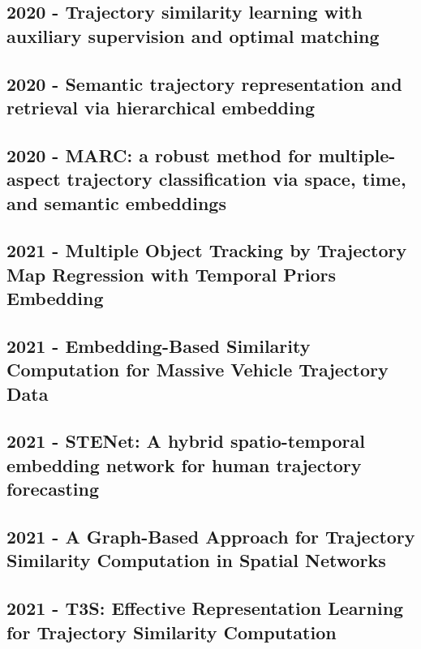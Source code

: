 \cite{fu2020trembr}

\subsection*{2020 - Trajectory similarity learning with auxiliary supervision and optimal matching}

\cite{zhang2020trajectory}

\subsection*{2020 - Semantic trajectory representation and retrieval via hierarchical embedding}
\cite{gao2020semantic}

\subsection*{2020 - MARC: a robust method for multiple-aspect trajectory classification via space, time, and semantic embeddings}
\cite{may2020marc}

\subsection*{2021 - Multiple Object Tracking by Trajectory Map Regression with Temporal Priors Embedding}
\cite{wan2021multiple}

\subsection*{2021 - Embedding-Based Similarity Computation for Massive Vehicle Trajectory Data}
\cite{chen2021embedding}

\subsection*{2021 - STENet: A hybrid spatio-temporal embedding network for human trajectory forecasting}
\cite{zhang2021stenet}

\subsection*{2021 - A Graph-Based Approach for Trajectory Similarity Computation in Spatial Networks}
\cite{han2021graph}

\subsection*{2021 - T3S: Effective Representation Learning for Trajectory Similarity Computation}
\cite{yang2021t3s}

